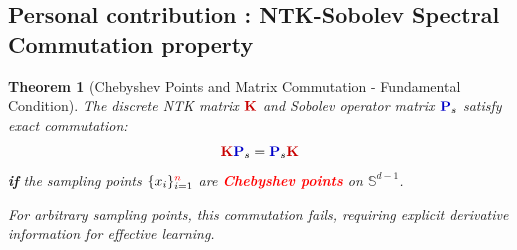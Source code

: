 \documentclass[a4paper]{article}
\newcommand{\Kop}{\textcolor{kernelcolor}{\mathbf{K}}}
\newcommand{\Pop}{\textcolor{sobolevcolor}{\mathbf{P}}}
\theoremstyle{plain}
\newtheorem{theorem}{Theorem}[section]
\theoremstyle{definition}
\theoremstyle{remark}
\begin{document}
\subsection{Personal contribution : NTK-Sobolev Spectral Commutation property}

\begin{theorem}[Chebyshev Points and Matrix Commutation - Fundamental Condition]
\label{thm:chebyshev_commutation}
The discrete NTK matrix $\Kop$ and Sobolev operator matrix $\Pop_s$ satisfy exact commutation:
\begin{equation}
\Kop \Pop_s = \Pop_s \Kop
\label{eq:chebyshev_commutation_condition}
\end{equation}
\textbf{if} the sampling points $\{x_i\}_{i=1}^{\textcolor{red}{n}}$ are \textcolor{red}{\textbf{Chebyshev points}} on $\mathbb{S}^{d-1}$.

For arbitrary sampling points, this commutation \textit{fails}, requiring explicit derivative information for effective learning.
\end{theorem}
\end{document}
